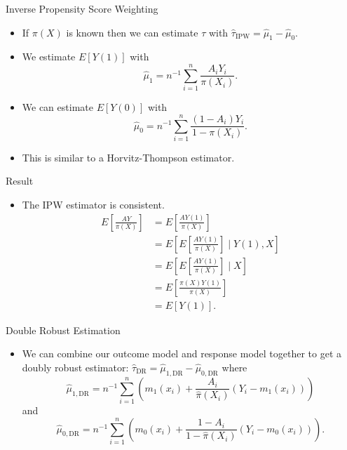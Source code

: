 \documentclass[handout]{beamer} %
\begin{document}
\begin{frame}{Inverse Propensity Score Weighting}

\begin{itemize}
    \item If $\pi(X)$ is known then we can estimate $\tau$ with 
    $\hat \tau_{\text{IPW}} = \hat \mu_1 - \hat \mu_0$. 
    \item We estimate $E[Y(1)]$ with
    \[\hat \mu_1 = n^{-1} \sum_{i = 1}^n \frac{A_i Y_i}{\pi(X_i)}.\]
    \item We can estimate $E[Y(0)]$ with
    \[\hat \mu_0 = n^{-1} \sum_{i = 1}^n \frac{(1 - A_i) Y_i}{1 - \pi(X_i)}.\]
    \item This is similar to a Horvitz-Thompson estimator.
\end{itemize}
\end{frame}

\begin{frame}{Result}

\begin{itemize}
    \item The IPW estimator is consistent.
    \begin{align*}
        E\left[\frac{AY}{\pi(X)}\right] 
        &= E\left[\frac{AY(1)}{\pi(X)}\right] \\
        &= E\left[E\left[\frac{AY(1)}{\pi(X)}\right] \mid Y(1), X\right]\\
        &= E\left[E\left[\frac{AY(1)}{\pi(X)}\right] \mid X\right]\\
        &= E\left[\frac{\pi(X)Y(1)}{\pi(X)}\right] \\
        &= E[Y(1)].
    \end{align*}
\end{itemize}

\end{frame}

\begin{frame}{Double Robust Estimation}

\begin{itemize}
    \item We can combine our outcome model and response model together to get a doubly
    robust estimator: $\hat \tau_{\text{DR}} = \hat \mu_{1, \text{DR}} - \hat \mu_{0, \text{DR}}$ where
    \[\hat \mu_{1,\text{DR}} = n^{-1} \sum_{i = 1}^n \left(m_1(x_i) + \frac{A_i}{\hat \pi(X_i)}(Y_i - m_1(x_i))\right)\]
    and 
    \[\hat \mu_{0,\text{DR}} = n^{-1} \sum_{i = 1}^n \left(m_0(x_i) + \frac{1 - A_i}{1 - \hat \pi(X_i)}(Y_i - m_0(x_i))\right).\]
\end{itemize}
\end{frame}
\end{document}
